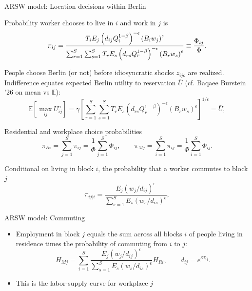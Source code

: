 \documentclass[11pt,notes=hide,aspectratio=169]{beamer}
\begin{document}
\begin{frame}{ARSW model: Location decisions within Berlin}
\begin{itemize}{\footnotesize
\item Probability worker chooses to live in $i$ and work in $j$ is
\begin{equation*} \label{eq:com_prob}
\pi _{ij}= \frac{T_{i} E_{j} \left( d_{ij}
Q_{i}^{1-\beta} \right)^{-\epsilon} \left( B_{i} w_{j} \right)^{\epsilon}}{%
\sum_{r=1}^{S} \sum_{s=1}^{S} T_{r} E_{s} \left( d_{rs} Q_{r}^{1-\beta}
\right)^{-\epsilon} \left( B_{r} w_{s} \right)^{\epsilon}} \equiv \frac{\Phi_{ij}}{\Phi} .
\end{equation*}
\item People choose Berlin (or not) before idiosyncratic shocks  $z_{ijo}$ are realized.
Indifference equates expected Berlin utility to reservation $\bar{U}$
(cf. Baqaee Burstein '26 on mean vs $\mathbb{E}$):
\begin{equation*} \label{eq:pm}
\mathbb{E} \left[\max_{ij} U_{ij}^{o} \right]  = \gamma \left[ \sum_{r=1}^{S} \sum_{s=1}^{S} T_{r} E_{s} \left( d_{rs}
Q_{r}^{1-\beta} \right)^{-\epsilon} \left( B_{r} w_{s} \right)^{\epsilon} %
\right]^{1/\epsilon} = \bar{U},  
\end{equation*}
\item Residential and workplace choice probabilities
\begin{equation*} \label{eq:ch_prob}
\pi_{Ri} = \sum_{j=1}^{S} \pi_{ij} = \frac{1}{\Phi} \sum_{j=1}^{S} \Phi_{ij}, \qquad  \pi_{Mj} = \sum_{i=1}^{S} \pi_{ij} = \frac{1}{\Phi}\sum_{i=1}^{S} \Phi_{ij}.
\end{equation*}
\item Conditional on living in block $i$, the probability that a worker commutes to block $j$ %
\begin{equation*}
\pi _{ij|i}=\frac{ E_{j} \left( w_{j} / d_{ij} \right)^{\epsilon}}{
\sum_{s=1}^{S} E_{s} \left( w_{s} / d_{is} \right)^{\epsilon}},
\end{equation*}
}\end{itemize}
\end{frame}
\begin{frame}{ARSW model: Commuting }
\begin{itemize}
\item Employment in block $j$ equals the sum across all blocks $i$ of people living in residence times the probability of commuting from $i$ to $j$:
\begin{equation*} \label{eq:wbo}
H_{Mj}=\sum_{i=1}^{S} \frac{E_{j}\left(
w_{j}/d_{ij}\right) ^{\epsilon }}{\sum_{s=1}^{S}E_{s}\left( w_{s}/d_{is}\right)
^{\epsilon }} H_{Ri}, \qquad d_{ij} = e^{\kappa \tau_{ij}}.
\end{equation*} \smallskip
\item This is the labor-supply curve for workplace $j$
\end{itemize}
\end{frame}
\end{document}
